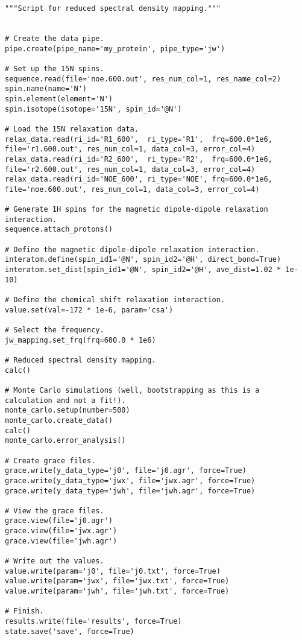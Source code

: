 \begin{lstlisting}
"""Script for reduced spectral density mapping."""


# Create the data pipe.
pipe.create(pipe_name='my_protein', pipe_type='jw')

# Set up the 15N spins.
sequence.read(file='noe.600.out', res_num_col=1, res_name_col=2)
spin.name(name='N')
spin.element(element='N')
spin.isotope(isotope='15N', spin_id='@N')

# Load the 15N relaxation data.
relax_data.read(ri_id='R1_600',  ri_type='R1',  frq=600.0*1e6, file='r1.600.out', res_num_col=1, data_col=3, error_col=4)
relax_data.read(ri_id='R2_600',  ri_type='R2',  frq=600.0*1e6, file='r2.600.out', res_num_col=1, data_col=3, error_col=4)
relax_data.read(ri_id='NOE_600', ri_type='NOE', frq=600.0*1e6, file='noe.600.out', res_num_col=1, data_col=3, error_col=4)

# Generate 1H spins for the magnetic dipole-dipole relaxation interaction.
sequence.attach_protons()

# Define the magnetic dipole-dipole relaxation interaction.
interatom.define(spin_id1='@N', spin_id2='@H', direct_bond=True)
interatom.set_dist(spin_id1='@N', spin_id2='@H', ave_dist=1.02 * 1e-10)

# Define the chemical shift relaxation interaction.
value.set(val=-172 * 1e-6, param='csa')

# Select the frequency.
jw_mapping.set_frq(frq=600.0 * 1e6)

# Reduced spectral density mapping.
calc()

# Monte Carlo simulations (well, bootstrapping as this is a calculation and not a fit!).
monte_carlo.setup(number=500)
monte_carlo.create_data()
calc()
monte_carlo.error_analysis()

# Create grace files.
grace.write(y_data_type='j0', file='j0.agr', force=True)
grace.write(y_data_type='jwx', file='jwx.agr', force=True)
grace.write(y_data_type='jwh', file='jwh.agr', force=True)

# View the grace files.
grace.view(file='j0.agr')
grace.view(file='jwx.agr')
grace.view(file='jwh.agr')

# Write out the values.
value.write(param='j0', file='j0.txt', force=True)
value.write(param='jwx', file='jwx.txt', force=True)
value.write(param='jwh', file='jwh.txt', force=True)

# Finish.
results.write(file='results', force=True)
state.save('save', force=True)
\end{lstlisting}



